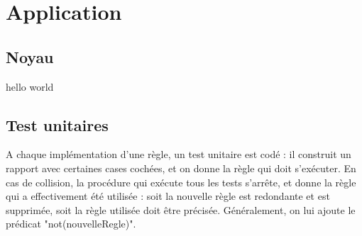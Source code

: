 \chapter{Application}

\section{Noyau}
hello world

\section{Test unitaires}

A chaque implémentation d'une règle, un test unitaire est codé : il construit un rapport avec certaines cases cochées, et on donne la règle qui doit s'exécuter.
En cas de collision, la procédure qui exécute tous les tests s'arrête, et donne la règle qui a effectivement été utilisée : soit la nouvelle règle est redondante et est supprimée, soit la règle utilisée doit être précisée. Généralement, on lui ajoute le prédicat "not(nouvelleRegle)". 